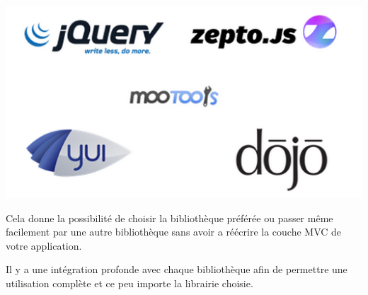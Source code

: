 \begin{center}
\includegraphics[scale=0.5]{img/CanJSlibraries.png}
\label{Graphique bibliothèque CanJS}
\end{center}

Cela donne la possibilité de choisir la bibliothèque préférée ou passer même facilement par une autre bibliothèque sans avoir a réécrire la couche MVC de votre application.

Il y a une intégration profonde avec chaque bibliothèque afin de permettre une utilisation complète et ce peu importe la librairie choisie.